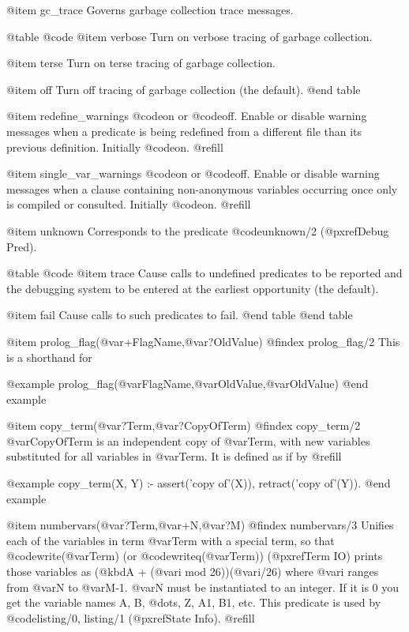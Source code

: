 @item gc_trace
Governs garbage collection trace messages.

@table @code
@item verbose
Turn on verbose tracing of garbage collection.

@item terse
Turn on terse tracing of garbage collection. 

@item off
Turn off tracing of garbage collection (the default).
@end table

@item redefine_warnings
@code{on} or @code{off}.  Enable or disable warning messages when a
predicate is being redefined from a different file than its previous
definition.  Initially @code{on}. @refill

@item single_var_warnings
@code{on} or @code{off}.  Enable or disable warning messages when a
clause containing non-anonymous variables occurring once only is
compiled or consulted.  Initially @code{on}. @refill

@item unknown
Corresponds to the predicate @code{unknown/2} (@pxref{Debug Pred}).

@table @code
@item trace
Cause calls to undefined predicates to be reported and the debugging
system to be entered at the earliest opportunity (the default).

@item fail
Cause calls to such predicates to fail.  
@end table
@end table

@item prolog_flag(@var{+FlagName},@var{?OldValue})
@findex prolog_flag/2
This is a shorthand for

@example
prolog_flag(@var{FlagName},@var{OldValue},@var{OldValue})
@end example

@item copy_term(@var{?Term},@var{?CopyOfTerm})
@findex copy_term/2
@var{CopyOfTerm} is an independent copy of @var{Term}, with new
variables substituted for all variables in @var{Term}.  It is defined as
if by @refill

@example
copy_term(X, Y) :-
        assert('copy of'(X)),
        retract('copy of'(Y)).
@end example

@item numbervars(@var{?Term},@var{+N},@var{?M})
@findex numbervars/3
Unifies each of the variables in term @var{Term} with a special term, so
that @code{write(@var{Term})} (or @code{writeq(@var{Term})})
(@pxref{Term IO}) prints those variables as (@kbd{A} + (@var{i} mod
26))(@var{i}/26) where @var{i} ranges from @var{N} to @var{M}-1.
@var{N} must be instantiated to an integer.  If it is 0 you get the
variable names A, B, @dots{}, Z, A1, B1, etc.  This predicate is used by
@code{listing/0, listing/1} (@pxref{State Info}). @refill

